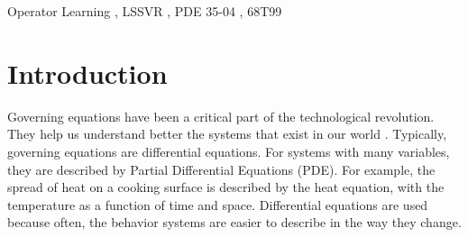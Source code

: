 \documentclass[preprint,12pt,times,authoryear]{elsarticle}
\begin{document}
\begin{frontmatter}
  \title{\judul}
  \author[upi]{Lala Septem Riza}
  \author[upi]{Ahmad Izzuddin}

  \begin{abstract}
    Numerical models of systems are a crucial part of science and engineering. The use of machine learning in this space for operator learning provides an alternative as data-driven surrogates. The Fourier Transform provides a key component for learning the relationship between a function and its derivatives. Building on Spectral Neural Operators (SNO), we propose a Support Vector Machine (SVM) based framework to learn the underlying governing equations of a system based on data. We study the viability and interpretability of the proposed framework on the derivative equation and the Burgers' equation. The model is able to learn from mathematically correct random data and is able to partially generalize to an exact solution of the Burgers' equation. The learned model is interpreted and verified to have learned the correct contributions of the input function coefficients to the output function coefficients.
  \end{abstract}
  \begin{keyword}
    Operator Learning \sep{} LSSVR \sep{} PDE
    \MSC{} 35{-}04 \sep{} 68T99
  \end{keyword}

\end{frontmatter}
\section{Introduction}
Governing equations have been a critical part of the technological revolution. They help us understand better the systems that exist in our world \citep{braunDifferentialEquationsTheir1993}. Typically, governing equations are differential equations. For systems with many variables, they are described by Partial Differential Equations (PDE). For example, the spread of heat on a cooking surface is described by the heat equation, with the temperature as a function of time and space. Differential equations are used because often, the behavior systems are easier to describe in the way they change.
\end{document}
